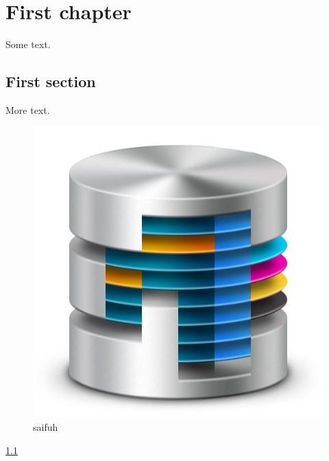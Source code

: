 

		\rhead{\today}

\lfoot{}			\cfoot{}				\rfoot{\thepage}


	
	
	
	\chapter{First chapter}
	Some text.
	
	\newpage
	
	\section{First section}
	More text.
	
	\begin{figure}[h]
		\centering
		\includegraphics[width=0.7\linewidth]{figs/titlepagefig}
		\caption[sidfuh]{saifuh}
		\label{fig:titlepagefig}
	\end{figure}
	
	\ref{fig:titlepagefig}
	

